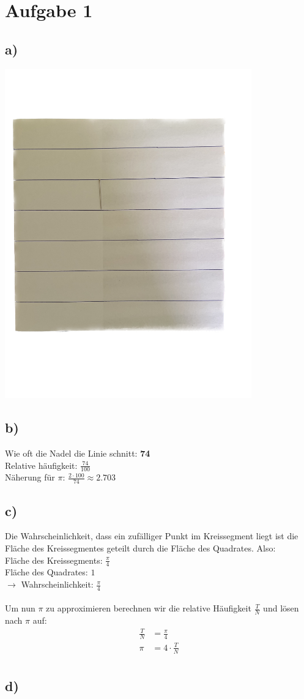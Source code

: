 \section*{Aufgabe 1}
\subsection*{a)}
\includegraphics[width=0.8\textwidth]{../img/a1a.png}
\subsection*{b)}
Wie oft die Nadel die Linie schnitt: \textbf{74} \\
Relative häufigkeit: $ \frac{ 74 }{ 100 }  $ \\
Näherung für $ \pi $: $ \frac{ 2 \cdot 100 }{ 74 } \approx 2.703 $
\subsection*{c)}
Die Wahrscheinlichkeit, dass ein zufälliger Punkt im Kreissegment liegt ist die Fläche des Kreissegmentes geteilt durch die Fläche des Quadrates. Also: \\
Fläche des Kreissegments: $ \frac{ \pi }{ 4 }  $\\
Fläche des Quadrates: $ 1 $ \\
$ \rightarrow  $ Wahrscheinlichkeit: $ \frac{ \pi }{ 4 }  $ \\ \\
Um nun $ \pi $ zu approximieren berechnen wir die relative Häufigkeit $ \frac{ T }{ N } $ und lösen nach $ \pi $ auf: \\
\begin{align*}
\frac{ T }{ N } &= \frac{ \pi }{ 4 } \\
\pi &= 4 \cdot \frac{ T }{ N } \\
\end{align*}
\subsection*{d)}


